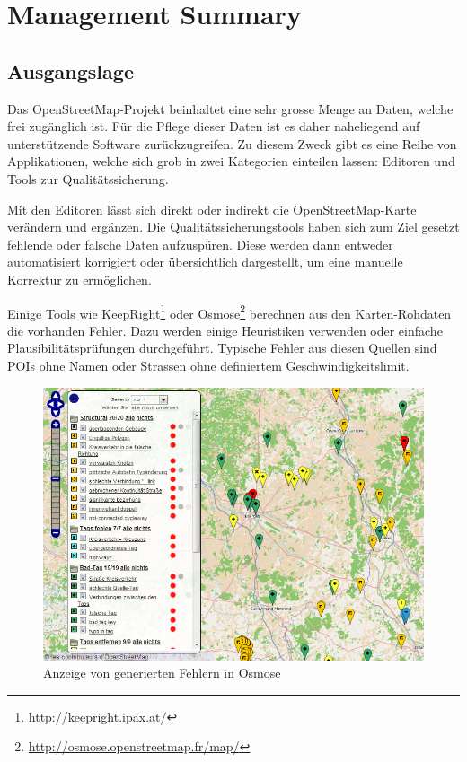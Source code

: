 \chapter*{Management Summary}
\thispagestyle{scrheadings}


\section*{Ausgangslage}
Das \gls{OpenStreetMap}-Projekt beinhaltet eine sehr grosse Menge an Daten, welche frei zugänglich ist.
Für die Pflege dieser Daten ist es daher naheliegend auf unterstützende Software zurückzugreifen.
Zu diesem Zweck gibt es eine Reihe von Applikationen, welche sich grob in zwei Kategorien einteilen lassen:
Editoren und Tools zur Qualitätssicherung.

Mit den Editoren lässt sich direkt oder indirekt die \gls{OpenStreetMap}-Karte verändern und ergänzen.
Die Qualitätssicherungstools haben sich zum Ziel gesetzt fehlende oder falsche Daten aufzuspüren.
Diese werden dann entweder automatisiert korrigiert oder übersichtlich dargestellt, um eine manuelle Korrektur zu ermöglichen.

Einige Tools wie KeepRight\footnote{\url{http://keepright.ipax.at/}} oder Osmose\footnote{\url{http://osmose.openstreetmap.fr/map/}} berechnen aus den Karten-Rohdaten die vorhanden Fehler.
Dazu werden einige Heuristiken verwenden oder einfache Plausibilitätsprüfungen durchgeführt.
Typische Fehler aus diesen Quellen sind \gls{POI}s ohne Namen oder Strassen ohne definiertem Geschwindigkeitslimit.

\begin{figure}[H]
	\centering
	\includegraphics[scale=0.4]{images/managementsummary/osmose-screenshot}
	\caption{Anzeige von generierten Fehlern in Osmose}
	\label{image-osmose-screenshot}
\end{figure}

